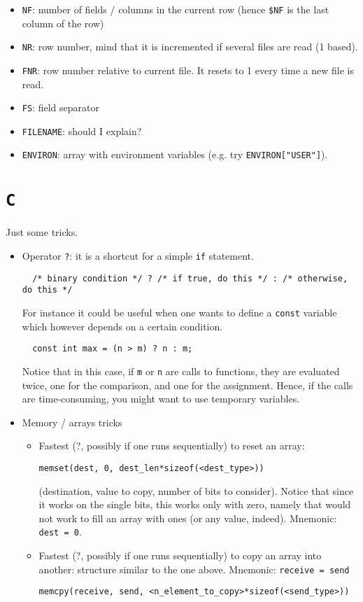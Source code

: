 \documentclass[a4paper,12pt,%
              final%
              ]{article}
\begin{document}
\begin{itemize}
\begin{itemize}
      \item \verb|NF|: number of fields / columns in the current row (hence \verb|$NF| is the last column of the row)
      \item \verb|NR|: row number, mind that it is incremented if several files are read (1 based).
      \item \verb|FNR|: row number relative to current file. It resets to 1 every time a new file is read. 
      \item \verb|FS|: field separator
      \item \verb|FILENAME|: should I explain?
      \item \verb|ENVIRON|: array with environment variables (e.g. try \verb|ENVIRON["USER"]|).
    \end{itemize}
\end{itemize}

\section{\texttt{C}}
\label{sec:c}
Just some tricks.
\begin{itemize}
  \item Operator \verb|?|: it is a shortcut for a simple \texttt{if} statement. 
\begin{verbatim}
  /* binary condition */ ? /* if true, do this */ : /* otherwise, do this */ 
\end{verbatim}
    For instance it could be useful when one wants to define a \texttt{const} variable which however depends on a certain condition.
\begin{verbatim}
  const int max = (n > m) ? n : m;
\end{verbatim}
    Notice that in this case, if \verb|m| or \verb|n| are calls to functions, they are evaluated twice, one for the comparison, and one for the assignment. Hence, if the calls are time-consuming, you might want to use temporary variables.
  \item Memory / arrays tricks
    \begin{itemize}
      \item Fastest (?, possibly if one runs sequentially) to reset an array:
\begin{verbatim}
memset(dest, 0, dest_len*sizeof(<dest_type>)) 
\end{verbatim}
        (destination, value to copy, number of bits to consider). Notice that since it works on the single bits, this works only with zero, namely that would not work to fill an array with ones (or any value, indeed). Mnemonic: \verb|dest = 0|. 
      \item Fastest (?, possibly if one runs sequentially) to copy an array into another: structure similar to the one above. Mnemonic: \verb|receive = send|
\begin{verbatim}
memcpy(receive, send, <n_element_to_copy>*sizeof(<send_type>))
\end{verbatim}
    \end{itemize}
    
\end{itemize}
\end{document}
